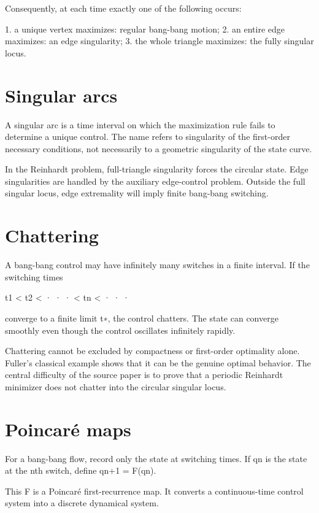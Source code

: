 Consequently, at each time exactly one of the following occurs:


1. a unique vertex maximizes: regular bang-bang motion; 2. an entire edge maximizes: an edge singularity; 3. the whole triangle maximizes: the fully singular locus.


\section{Singular arcs}

A singular arc is a time interval on which the maximization rule fails to determine a unique control. The name refers to singularity of the first-order necessary conditions, not necessarily to a geometric singularity of the state curve.


In the Reinhardt problem, full-triangle singularity forces the circular state. Edge singularities are handled by the auxiliary edge-control problem. Outside the full singular locus, edge extremality will imply finite bang-bang switching.


\section{Chattering}

A bang-bang control may have infinitely many switches in a finite interval. If the switching times


t1 < t2 < · · · < tn < · · ·


converge to a finite limit t∗, the control chatters. The state can converge smoothly even though the control oscillates infinitely rapidly.


Chattering cannot be excluded by compactness or first-order optimality alone. Fuller’s classical example shows that it can be the genuine optimal behavior. The central difficulty of the source paper is to prove that a periodic Reinhardt minimizer does not chatter into the circular singular locus.


\section{Poincaré maps}

For a bang-bang flow, record only the state at switching times. If qn is the state at the nth switch, define qn+1 = F(qn).


This F is a Poincaré first-recurrence map. It converts a continuous-time control system into a discrete dynamical system.



